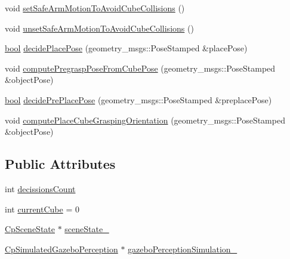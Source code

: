 \begin{DoxyCompactItemize}
\item 
void \hyperlink{classsm__moveit__4_1_1cl__perception__system_1_1ClPerceptionSystem_a5304dc8734488564093525dfe4f4bcd1}{set\+Safe\+Arm\+Motion\+To\+Avoid\+Cube\+Collisions} ()
\item 
void \hyperlink{classsm__moveit__4_1_1cl__perception__system_1_1ClPerceptionSystem_ab8bbe4be37d763fde0e67e9edd33b83a}{unset\+Safe\+Arm\+Motion\+To\+Avoid\+Cube\+Collisions} ()
\item 
\hyperlink{classbool}{bool} \hyperlink{classsm__moveit__4_1_1cl__perception__system_1_1ClPerceptionSystem_af6ff9a225d451bdee312573296ed02a8}{decide\+Place\+Pose} (geometry\+\_\+msgs\+::\+Pose\+Stamped \&place\+Pose)
\item 
void \hyperlink{classsm__moveit__4_1_1cl__perception__system_1_1ClPerceptionSystem_a57222e7497e1296974c0c16b55810cef}{compute\+Pregrasp\+Pose\+From\+Cube\+Pose} (geometry\+\_\+msgs\+::\+Pose\+Stamped \&object\+Pose)
\item 
\hyperlink{classbool}{bool} \hyperlink{classsm__moveit__4_1_1cl__perception__system_1_1ClPerceptionSystem_a027d06bc7cba5ace251a65bb29777c26}{decide\+Pre\+Place\+Pose} (geometry\+\_\+msgs\+::\+Pose\+Stamped \&preplace\+Pose)
\item 
void \hyperlink{classsm__moveit__4_1_1cl__perception__system_1_1ClPerceptionSystem_afda35b6252c0a5c0692e3ff956609c23}{compute\+Place\+Cube\+Grasping\+Orientation} (geometry\+\_\+msgs\+::\+Pose\+Stamped \&object\+Pose)
\end{DoxyCompactItemize}
\subsection*{Public Attributes}
\begin{DoxyCompactItemize}
\item 
int \hyperlink{classsm__moveit__4_1_1cl__perception__system_1_1ClPerceptionSystem_ac41f768142251a6a4330c6ca1050b2fe}{decissions\+Count}
\item 
int \hyperlink{classsm__moveit__4_1_1cl__perception__system_1_1ClPerceptionSystem_ae2a80b803814af8b3c87f810f2728af0}{current\+Cube} = 0
\item 
\hyperlink{classsm__moveit__4_1_1cl__perception__system_1_1CpSceneState}{Cp\+Scene\+State} $\ast$ \hyperlink{classsm__moveit__4_1_1cl__perception__system_1_1ClPerceptionSystem_a82ea8feeb2fa43349f91ed59137b3890}{scene\+State\+\_\+}
\item 
\hyperlink{classsm__moveit__4_1_1cl__perception__system_1_1CpSimulatedGazeboPerception}{Cp\+Simulated\+Gazebo\+Perception} $\ast$ \hyperlink{classsm__moveit__4_1_1cl__perception__system_1_1ClPerceptionSystem_a027c07df3f1a2cc0c30be111b27dbe5c}{gazebo\+Perception\+Simulation\+\_\+}
\end{DoxyCompactItemize}
